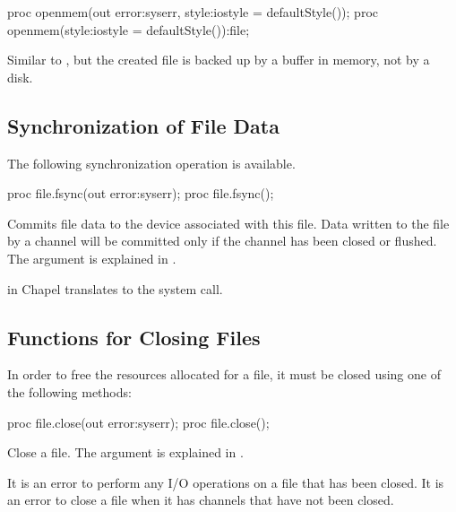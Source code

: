 \begin{protohead}
proc openmem(out error:syserr, style:iostyle = defaultStyle());
proc openmem(style:iostyle = defaultStyle()):file;
\end{protohead}
\begin{protobody}
Similar to , but
the created file is backed up by a buffer in memory, not by a disk.
\end{protobody}


\subsection{Synchronization of File Data}
\label{IO_file_synchronization}

The following synchronization operation is available.

\begin{protohead}
proc file.fsync(out error:syserr);
proc file.fsync();
\end{protohead}
\begin{protobody}
Commits file data to the device associated with this file.
Data written to the file by a channel will be committed
only if the channel has been closed or flushed.
The  argument is explained in .
\end{protobody}
\begin{craychapel}
 in Chapel translates to the  system call.
\end{craychapel}


\subsection{Functions for Closing Files}
\label{IO_closing_files}

In order to free the resources allocated for a file, it
must be closed using one of the following methods:

\begin{protohead}
proc file.close(out error:syserr);
proc file.close();
\end{protohead}
\begin{protobody}
Close a file.
The  argument is explained in .
\end{protobody}

It is an error to perform any I/O operations on a file
that has been closed.
It is an error to close a file when it has channels that
have not been closed.

